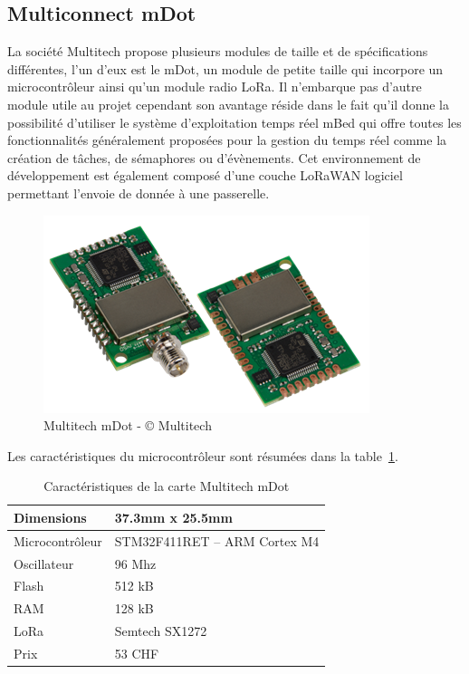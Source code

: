 \subsection{Multiconnect mDot}

La société Multitech propose plusieurs modules de taille et de spécifications différentes, l’un d’eux est le mDot, un module de petite taille qui incorpore un microcontrôleur ainsi qu’un module radio LoRa. Il n’embarque pas d’autre module utile au projet cependant son avantage réside dans le fait qu’il donne la possibilité d’utiliser le système d’exploitation temps réel mBed qui offre toutes les fonctionnalités généralement proposées pour la gestion du temps réel comme la création de tâches, de sémaphores ou d’évènements. Cet environnement de développement est également composé d’une couche LoRaWAN logiciel permettant l’envoie de donnée à une passerelle.

\begin{figure}[htb]
\centering 
\includegraphics[width=0.5\columnwidth]{../images/Multitech-mDot.png} 
\caption[Multitech mDot]{Multitech mDot - © Multitech}
\label{fig:multitech_mdot}
\end{figure}

Les caractéristiques du microcontrôleur sont résumées dans la table~\ref{tab:multitech_mdot_cara}.

\begin{table}[htb]
\caption[Multitech mDot Caractéristiques]{Caractéristiques de la carte Multitech mDot}
\label{tab:multitech_mdot_cara}
\centering
\begin{tabular}{ l | l }
\toprule
Dimensions & 37.3mm x 25.5mm \\
\midrule
Microcontrôleur & STM32F411RET – ARM Cortex M4 \\
\midrule
Oscillateur & 96 Mhz \\
\midrule
Flash & 512 kB \\
\midrule
RAM & 128 kB \\
\midrule
LoRa & Semtech SX1272 \\
\midrule
Prix & 53 CHF\\
\bottomrule 
\end{tabular}
\end{table}

